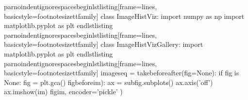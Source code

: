 \markdownRendererDocumentBegin
\markdownRendererBackslash{}par\markdownRendererBackslash{}noindent\markdownRendererBackslash{}ignorespaces\markdownRendererBackslash{}begin\markdownRendererLeftBrace{}lstlisting\markdownRendererRightBrace{}[frame=lines, basicstyle=\markdownRendererBackslash{}footnotesize\markdownRendererBackslash{}ttfamily] class ImageHistViz: import numpy as np import matplotlib.pyplot as plt\markdownRendererInterblockSeparator
{}\markdownRendererInterblockSeparator
{}\markdownRendererBackslash{}end\markdownRendererLeftBrace{}lstlisting\markdownRendererRightBrace{} \markdownRendererBackslash{}par\markdownRendererBackslash{}noindent\markdownRendererBackslash{}ignorespaces\markdownRendererBackslash{}begin\markdownRendererLeftBrace{}lstlisting\markdownRendererRightBrace{}[frame=lines, basicstyle=\markdownRendererBackslash{}footnotesize\markdownRendererBackslash{}ttfamily] class ImageHistVizGallery: import matplotlib.pyplot as plt\markdownRendererInterblockSeparator
{}\markdownRendererInterblockSeparator
{}\markdownRendererBackslash{}end\markdownRendererLeftBrace{}lstlisting\markdownRendererRightBrace{} \markdownRendererBackslash{}par\markdownRendererBackslash{}noindent\markdownRendererBackslash{}ignorespaces\markdownRendererBackslash{}begin\markdownRendererLeftBrace{}lstlisting\markdownRendererRightBrace{}[frame=lines, basicstyle=\markdownRendererBackslash{}footnotesize\markdownRendererBackslash{}ttfamily]\markdownRendererInterblockSeparator
{}\markdownRendererSectionBegin
{}\markdownRendererInterblockSeparator
{}imageseq = takebefore\markdownRendererUnderscore{}after(fig=None): if fig is None: fig = plt.gca()\markdownRendererInterblockSeparator
{}\markdownRendererInterblockSeparator
{}
\markdownRendererSectionEnd \markdownRendererSectionBegin
{}\markdownRendererInterblockSeparator
{}figbeforeim): ax = subfig.subplots() ax.axis('off') ax.imshow(im) figim, encoder='pickle' )\markdownRendererInterblockSeparator

